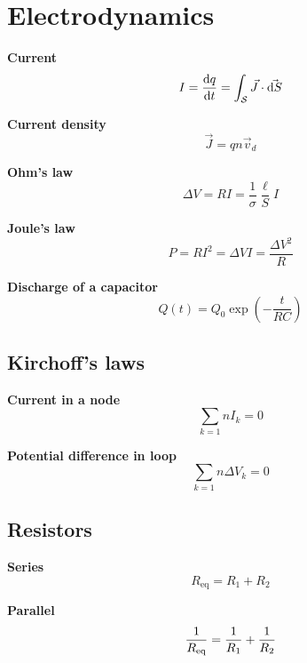 \documentclass[10pt]{extarticle}
\numberwithin{equation}{section}
\begin{document}
\section{Electrodynamics}
\begin{multicols}{2}
    \textbf{Current}
    \begin{equation}
        I = \dv{q}{t} = \int_\mathcal{S} \vec J \cdot \vec{\dd S}
    \end{equation}

    \textbf{Current density}
    \begin{equation}
        \vec J = q n \vec v_d
    \end{equation}

    \textbf{Ohm's law}
    \begin{equation}
        \Delta V = RI = \frac{1}{\sigma} \frac{\ell}{S} I
    \end{equation}

    \textbf{Joule's law}
    \begin{equation}
        P = R I ^2 = \Delta V I = \frac{\Delta V^2}{R}
    \end{equation}

    \textbf{Discharge of a capacitor}
    \begin{equation}
        Q(t) = Q_0 \exp(-\frac{t}{RC})
    \end{equation}

    \subsection{Kirchoff's laws}
    \textbf{Current in a node}
    \begin{equation}
        \sum_{k = 1}{n} I_k = 0
    \end{equation}

    \textbf{Potential difference in loop}
    \begin{equation}
        \sum_{k = 1}{n} \Delta V_k = 0
    \end{equation}

    \subsection{Resistors}

    \textbf{Series}
    \begin{equation}
        R_\text{eq} = R_1 + R_2
    \end{equation}

    \textbf{Parallel}
    \begin{equation}
        \frac{1}{R_\text{eq}} = \frac{1}{R_1} + \frac{1}{R_2}
    \end{equation}
\end{multicols}
\end{document}

